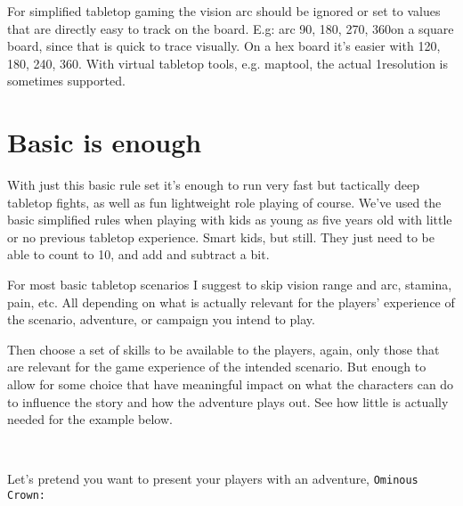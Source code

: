 For simplified tabletop gaming the vision arc should be ignored or set to values that are directly easy to track on the board. E.g: arc 90, 180, 270, 360\degrees on a square board, since that is quick to trace visually. On a hex board it's easier with 120, 180, 240, 360\degree. With virtual tabletop tools, e.g. maptool, the actual 1\degrees resolution is sometimes supported.

%







\section*{Basic is enough}
\label{sec:basicenough}  %
With just this basic rule set it's enough to run very fast but tactically deep tabletop fights, as well as fun lightweight role playing of course. We've used the basic simplified rules when playing with kids as young as five years old with little or no previous tabletop experience. Smart kids, but still. They just need to be able to count to 10, and add and subtract a bit.

For most basic tabletop scenarios I suggest to skip vision range and arc, stamina, pain, etc. All depending on what is actually relevant for the players' experience of the scenario, adventure, or campaign you intend to play.

Then choose a set of skills to be available to the players, again, only those that are relevant for the game experience of the intended scenario. But enough to allow for some choice that have meaningful impact on what the characters can do to influence the story and how the adventure plays out. See how little is actually needed for the example below.

\

\noindent Let's pretend you want to present your players with an adventure, \texttt{Ominous Crown:}


